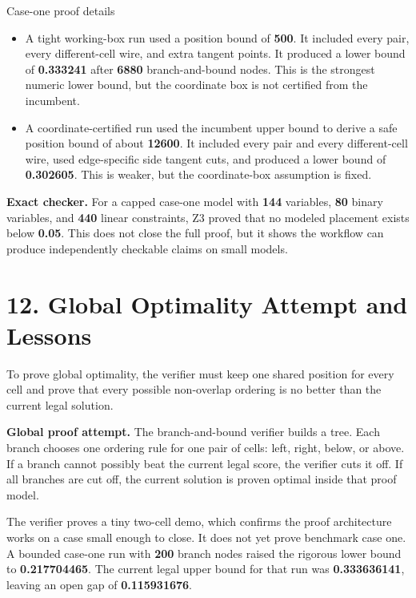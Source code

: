 \documentclass[11pt]{article}
\begin{document}
\begin{plainbox}{Case-one proof details}
\begin{itemize}
    \item A tight working-box run used a position bound of \textbf{500}. It included every pair, every different-cell wire, and extra tangent points. It produced a lower bound of \textbf{0.333241} after \textbf{6880} branch-and-bound nodes. This is the strongest numeric lower bound, but the coordinate box is not certified from the incumbent.
    \item A coordinate-certified run used the incumbent upper bound to derive a safe position bound of about \textbf{12600}. It included every pair and every different-cell wire, used edge-specific side tangent cuts, and produced a lower bound of \textbf{0.302605}. This is weaker, but the coordinate-box assumption is fixed.
\end{itemize}
\end{plainbox}

\begin{proofbox}
\textbf{Exact checker.} For a capped case-one model with \textbf{144} variables, \textbf{80} binary variables, and \textbf{440} linear constraints, Z3 proved that no modeled placement exists below \textbf{0.05}. This does not close the full proof, but it shows the workflow can produce independently checkable claims on small models.
\end{proofbox}

\newpage

\section{12. Global Optimality Attempt and Lessons}

To prove global optimality, the verifier must keep one shared position for every cell and prove that every possible non-overlap ordering is no better than the current legal solution.

\begin{proofbox}
\textbf{Global proof attempt.} The branch-and-bound verifier builds a tree. Each branch chooses one ordering rule for one pair of cells: left, right, below, or above. If a branch cannot possibly beat the current legal score, the verifier cuts it off. If all branches are cut off, the current solution is proven optimal inside that proof model.
\end{proofbox}

The verifier proves a tiny two-cell demo, which confirms the proof architecture works on a case small enough to close. It does not yet prove benchmark case one. A bounded case-one run with \textbf{200} branch nodes raised the rigorous lower bound to \textbf{0.217704465}. The current legal upper bound for that run was \textbf{0.333636141}, leaving an open gap of \textbf{0.115931676}.
\end{document}
